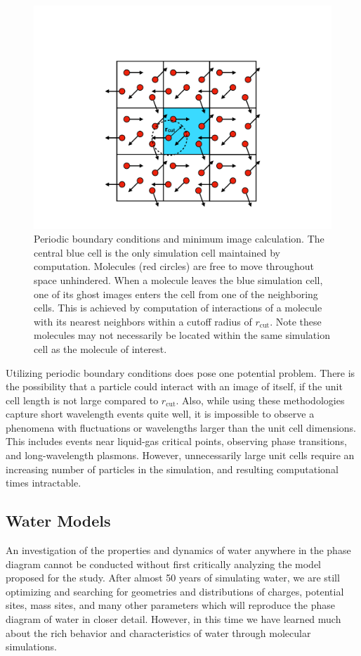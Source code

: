 \begin{figure}
\includegraphics[width=\linewidth]{Figures/PBC}
\caption{\label{fig:PBC} Periodic boundary conditions and minimum
  image calculation. The central blue cell is the only simulation cell
  maintained by computation. Molecules (red circles) are free to move
  throughout space unhindered. When a molecule leaves the blue
  simulation cell, one of its ghost images enters the cell from one of
  the neighboring cells. This is achieved by computation of
  interactions of a molecule with its nearest neighbors within a
  cutoff radius of $r_{\mathrm{cut}}$. Note these molecules may not
  necessarily be located within the same simulation cell as the
  molecule of interest.}
\end{figure}

Utilizing periodic boundary conditions does pose one potential
problem. There is the possibility that a particle could interact with
an image of itself, if the unit cell length is not large compared to
$r_{\mathrm{cut}}$. Also, while using these methodologies capture
short wavelength events quite well, it is impossible to observe a
phenomena with fluctuations or wavelengths larger than the unit cell
dimensions. This includes events near liquid-gas critical points,
observing phase transitions, and long-wavelength plasmons. However,
unnecessarily large unit cells require an increasing number of
particles in the simulation, and resulting computational times
intractable.



\subsection{Water Models}\label{sec:WaterModels}
An investigation of the properties and dynamics of water anywhere in
the phase diagram cannot be conducted without first critically
analyzing the model proposed for the study. After almost 50 years of
simulating water, we are still optimizing and searching for geometries
and distributions of charges, potential sites, mass sites, and many
other parameters which will reproduce the phase diagram of water in
closer detail. However, in this time we have learned much about the
rich behavior and characteristics of water through molecular
simulations. 


